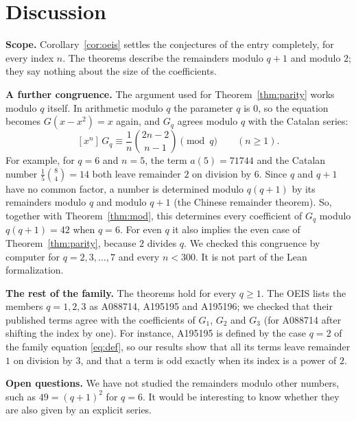 \documentclass[11pt,a4paper]{article}
\theoremstyle{definition}
\theoremstyle{remark}
\newcommand{\coeff}[2]{[x^{#1}]\,#2}
\newcommand{\para}[1]{\par\medskip\noindent\textbf{#1}\enspace}
\begin{document}
\section{Discussion}\label{sec:discussion}

\para{Scope.} Corollary~\ref{cor:oeis} settles the conjectures of the entry completely,
for every index $n$. The theorems describe the remainders modulo $q+1$ and modulo $2$; they say nothing about the size
of the coefficients.

\para{A further congruence.} The argument used for Theorem~\ref{thm:parity} works modulo $q$ itself. In arithmetic
modulo $q$ the parameter $q$ is $0$, so the equation becomes $G(x-x^2)=x$ again, and $G_q$ agrees modulo $q$ with the
Catalan series:
\[
\coeff{n}{G_q}\equiv\frac{1}{n}\binom{2n-2}{n-1}\pmod q\qquad(n\ge1).
\]
For example, for $q=6$ and $n=5$, the term $a(5)=71744$ and the Catalan number $\frac15\binom84=14$ both leave remainder $2$ on division by $6$. Since $q$ and $q+1$ have no common factor, a number is determined modulo $q(q+1)$ by its
remainders modulo $q$ and modulo $q+1$ (the Chinese remainder theorem). So, together with Theorem~\ref{thm:mod}, this
determines every coefficient of $G_q$ modulo $q(q+1)=42$ when $q=6$. For even $q$ it also implies the even case of Theorem~\ref{thm:parity}, because $2$ divides $q$. We checked
this congruence by computer for $q=2,3,\dots,7$ and every $n<300$. It is not part of the Lean formalization.

\para{The rest of the family.} The theorems hold for every $q\ge1$. The OEIS lists the members $q=1,2,3$ as A088714,
A195195 and A195196; we checked that their published terms agree with the coefficients of $G_1$, $G_2$ and $G_3$ (for
A088714 after shifting the index by one). For instance, A195195 is defined by the case $q=2$ of
the family equation \eqref{eq:def}, so our results show that all its terms leave remainder $1$ on division by $3$, and that a term is odd
exactly when its index is a power of $2$.

\para{Open questions.} We have not studied the remainders modulo other numbers, such as $49=(q+1)^2$
for $q=6$. It would be interesting to know whether they are also given by an explicit series.
\end{document}
